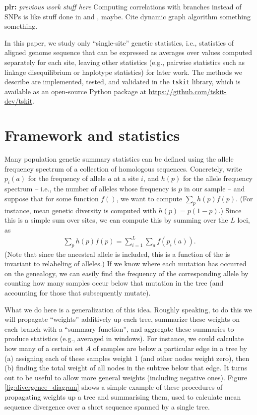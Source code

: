 \documentclass{article}
\newcommand{\tskit}{{\texttt{tskit}}}
\newcommand{\plr}[1]{{\color{blue}\textbf{plr:} \it #1}}
\begin{document}
\plr{previous work stuff here}
Computing correlations with branches instead of SNPs is like stuff done in \citet{zollner2005coalescent} and \citet{minichiello2006mapping}, maybe.
Cite dynamic graph algorithm something something.

In this paper, we study only ``single-site'' genetic statistics,
i.e., statistics of aligned genome sequence that can be expressed as averages over values computed
separately for each site,
leaving other statistics (e.g., pairwise statistics such as linkage disequilibrium
or haplotype statistics) for later work.
The methods we describe are implemented, tested, and validated in the \tskit{} library,
which is available as an open-source Python package at \url{https://github.com/tskit-dev/tskit}.


\section*{Framework and statistics}

Many population genetic summary statistics can be defined using the allele frequency spectrum
of a collection of homologous sequences.
Concretely, write $p_i(a)$ for the frequency of allele $a$ at a site $i$,
and $h(p)$ for the allele frequency spectrum
-- i.e., the number of alleles whose frequency is $p$ in our sample --
and suppose that for some function $f()$, we want to compute $\sum_p h(p) f(p)$.
(For instance, mean genetic diversity is computed with $h(p) = p (1-p)$.)
Since this is a simple sum over sites,
we can compute this by summing over the $L$ loci, as
\begin{align*}
    \sum_p h(p) f(p) = \sum_{i=1}^L \sum_a f(p_i(a)).
\end{align*}
(Note that since the ancestral allele is included, this is a function of the
is invariant to relabeling of alleles.)
If we know where each mutation has occurred on the genealogy,
we can easily find the frequency of the corresponding allele by counting how many samples
occur below that mutation in the tree (and accounting for those that subsequently mutate).

What we do here is a generalization of this idea.
Roughly speaking, to do this we will
propagate ``weights'' additively up each tree,
summarize these weights on each branch with a ``summary function'',
and aggregate these summaries to produce statistics
(e.g., averaged in windows).
For instance, we could calculate how many of a certain set $A$ of samples
are below a particular edge in a tree
by (a) assigning each of these samples weight 1 (and other nodes weight zero), then
(b) finding the total weight of all nodes in the subtree below that edge.
It turns out to be useful to allow more general weights (including negative ones).
Figure \ref{fig:divergence_diagram} shows a simple example of these procedures
of propagating weights up a tree and summarising them,
used to calculate mean sequence divergence over a short sequence spanned by a single tree.
\end{document}
